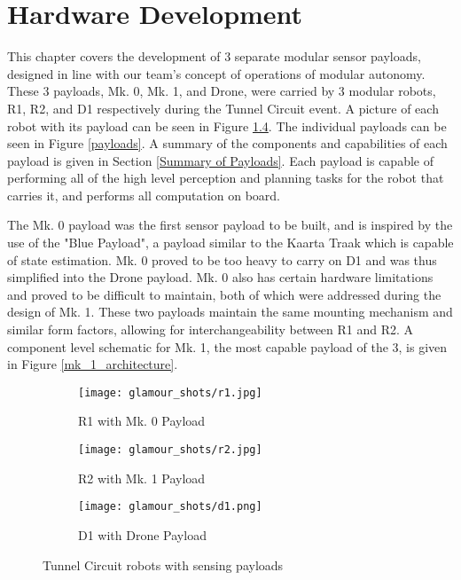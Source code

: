 \chapter{Hardware Development}

This chapter covers the development of 3 separate modular sensor payloads, designed in line with our team's concept of operations of modular autonomy. These 3 payloads, Mk. 0, Mk. 1, and Drone, were carried by 3 modular robots, R1, R2, and D1 respectively during the Tunnel Circuit event. A picture of each robot with its payload can be seen in Figure \ref{glamour_shots}. The individual payloads can be seen in Figure \ref{payloads}. A summary of the components and capabilities of each payload is given in Section \ref{Summary of Payloads}. Each payload is capable of performing all of the high level perception and planning tasks for the robot that carries it, and performs all computation on board.

The Mk. 0 payload was the first sensor payload to be built, and is inspired by the use of the "Blue Payload", a payload similar to the Kaarta Traak \cite{kaarta_traak} which is capable of state estimation. Mk. 0 proved to be too heavy to carry on D1 and was thus simplified into the Drone payload. Mk. 0 also has certain hardware limitations and proved to be difficult to maintain, both of which were addressed during the design of Mk. 1. These two payloads maintain the same mounting mechanism and similar form factors, allowing for interchangeability between R1 and R2. A component level schematic for Mk. 1, the most capable payload of the 3, is given in Figure \ref{mk_1_architecture}.

\begin{figure}
	\centering
	\begin{subfigure}{0.32\textwidth}
		\texttt{[image: glamour\_shots/r1.jpg]}
		\caption{R1 with Mk. 0 Payload}
		\label{r1_glamour}
	\end{subfigure}		
	\hfill
	\begin{subfigure}{0.32\textwidth}
		\texttt{[image: glamour\_shots/r2.jpg]}
		\caption{R2 with Mk. 1 Payload}
		\label{r2_glamour}		
	\end{subfigure}
	\hfill
	\begin{subfigure}{0.32\textwidth}
		\texttt{[image: glamour\_shots/d1.png]}
		\caption{D1 with Drone Payload}
		\label{d1_glamour}
	\end{subfigure}	
	\caption{Tunnel Circuit robots with sensing payloads}
	\label{glamour_shots}
\end{figure}

